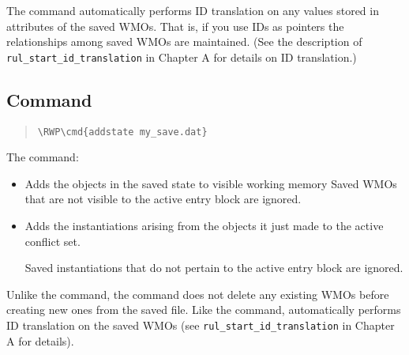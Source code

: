 The  command automatically performs ID translation on
any  values stored in attributes of the saved
WMOs. That is, if you use IDs as pointers the relationships among
saved WMOs are maintained. (See the description of
\verb|rul_start_id_translation| in Chapter A for details on ID
translation.)

\subsection{ Command}


\begin{quote}
\begin{Verbatim}[commandchars=\\\{\}]
\RWP\cmd{addstate my_save.dat}
\end{Verbatim}
\end{quote}

The  command:

\begin{itemize}
\item Adds the objects in the saved state to visible working memory
  Saved WMOs that are not visible to the active entry block are
  ignored.
\item Adds the instantiations arising from the objects it just made to
  the active conflict set.

  Saved instantiations that do not pertain to the active entry block
  are ignored.
\end{itemize}

Unlike the  command, the  command does not
delete any existing WMOs before creating new ones from the saved
file. Like the  command,  automatically
performs ID translation on the saved WMOs (see
\verb|rul_start_id_translation| in Chapter A for details).


